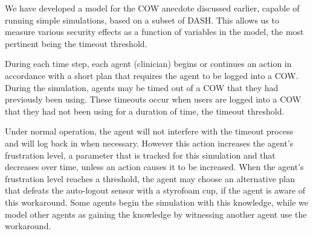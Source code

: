 \documentclass{acm_proc_article-sp}
\newcommand{\ignore}[1] {}
\begin{document}
We have developed a model for the COW anecdote discussed earlier,
capable of running simple simulations, based on a subset of DASH. This
allows us to measure various security effects as a function of
variables in the model, the most pertinent being the timeout
threshold.

During each time step, each agent (clinician) begins or continues an action in
accordance with a short plan that requires the agent to be logged into a COW. 
During the simulation, agents may be timed out of a COW that
they had previously been using. These timeouts occur when users are
logged into a COW that they had not been using for a duration of time,
the timeout threshold.

Under normal operation, the agent will not interfere with the timeout
process and will log back in when necessary. However this action
increases the agent's frustration level, a parameter that is tracked
for this simulation and that decreases over time, unless an action
causes it to be increased. When the agent's frustration level reaches
a threshold, the agent may choose an alternative plan that defeats the
auto-logout sensor with a styrofoam cup, if the agent is aware of this
workaround. Some agents begin the simulation with this knowledge,
while we model other agents as gaining the knowledge by witnessing
another agent use the workaround.



\ignore{\textcolor{red}{In each time step, simulation data and statistics are also updated. The two most important statistics that are measured are net exposure and average peak frustration. Net exposure is defined as the total duration of time for which clinicians are logged into COWs but not within close proximity to them. Peak frustration for a given clinician is defined as the highest level of experienced frustration for that clinician. Average peak frustration is computed by averaging peak frustrations over all clinicians.}}

\ignore{\textcolor{red}{Each clinician has a frustration value that changes when an action is carried out. Clinicians may be timed out of a COW that they had previously been using. These timeouts occur when users are logged into a COW that they had not been using for a duration of time, the timeout threshold. This results in the user experiencing further frustration the next time the user attempts an action that requires that COW. Users also experience a slight reduction in frustration every time step. If the user knows about the styrofoam cup workaround, the COW with which the user is interacting does not have a styrofoam cup placed over its proximity sensor, and a user's frustration exceeds her frustration threshold, she will employ said styrofoam cup workaround.}}
\end{document}
